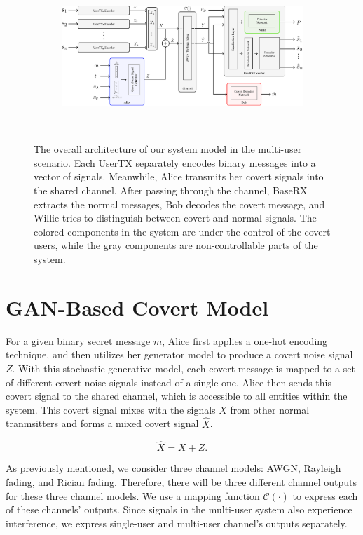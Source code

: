 \begin{figure}[thp]
	\center
	\begin{subfigure}{0.7\textwidth}
		\includegraphics[width=\linewidth]{figs/multi_system_architecture}
	\end{subfigure}
	\\
	\caption{The overall architecture of our system model in the multi-user scenario. Each UserTX separately encodes binary messages into a vector of signals. Meanwhile, Alice transmits her covert signals into the shared channel. After passing through the channel, BaseRX extracts the normal messages, Bob decodes the covert message, and Willie tries to distinguish between covert and normal signals. The colored components in the system are under the control of the covert users, while the gray components are non-controllable parts of the system.}
	\label{fig:multi_system_architecture}
\end{figure}

\section{GAN-Based Covert Model}
For a given binary secret message \(m\), Alice first applies a one-hot encoding technique, and then utilizes her generator model to produce a covert noise signal \(Z\). With this stochastic generative model, each covert message is mapped to a set of different covert noise signals instead of a single one. Alice then sends this covert signal to the shared channel, which is accessible to all entities within the system. This covert signal mixes with the signals \(X\) from other normal tranmsitters and forms a mixed covert signal \(\hat{X}\). 

\begin{equation}
	\hat{X} = X + Z.
\end{equation}

As previously mentioned, we consider three channel models: AWGN, Rayleigh fading, and Rician fading. Therefore, there will be three different channel outputs for these three channel models. We use a mapping function \(\mathcal{C}(\cdot)\) to express each of these channels' outputs. Since signals in the multi-user system also experience interference, we express single-user and multi-user channel's outputs separately.

